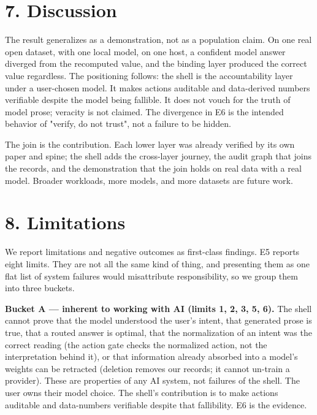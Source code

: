 \documentclass[11pt,a4paper]{article}
\begin{document}
\section*{7. Discussion}
The result generalizes as a demonstration, not as a population claim. On one real open dataset, with one local model, on one host, a confident model answer diverged from the recomputed value, and the binding layer produced the correct value regardless. The positioning follows: the shell is the accountability layer under a user-chosen model. It makes actions auditable and data-derived numbers verifiable despite the model being fallible. It does not vouch for the truth of model prose; veracity is not claimed. The divergence in E6 is the intended behavior of "verify, do not trust", not a failure to be hidden.

The join is the contribution. Each lower layer was already verified by its own paper and spine; the shell adds the cross-layer journey, the audit graph that joins the records, and the demonstration that the join holds on real data with a real model. Broader workloads, more models, and more datasets are future work.

\section*{8. Limitations}
We report limitations and negative outcomes as first-class findings. E5 reports eight limits. They are not all the same kind of thing, and presenting them as one flat list of system failures would misattribute responsibility, so we group them into three buckets.

\textbf{Bucket A --- inherent to working with AI (limits 1, 2, 3, 5, 6).} The shell cannot prove that the model understood the user's intent, that generated prose is true, that a routed answer is optimal, that the normalization of an intent was the correct reading (the action gate checks the normalized action, not the interpretation behind it), or that information already absorbed into a model's weights can be retracted (deletion removes our records; it cannot un-train a provider). These are properties of any AI system, not failures of the shell. The user owns their model choice. The shell's contribution is to make actions auditable and data-numbers verifiable despite that fallibility. E6 is the evidence.
\end{document}
